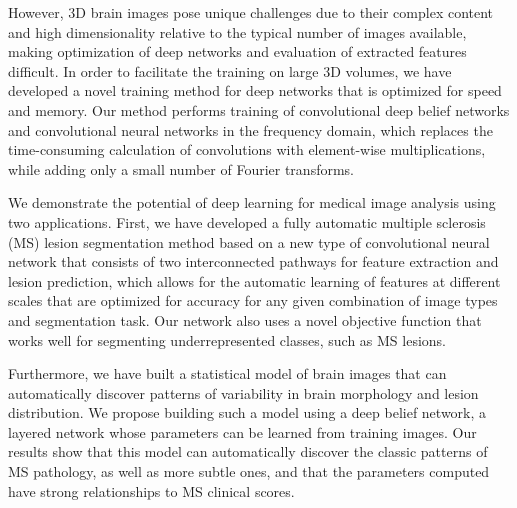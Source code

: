 However, 3D brain images pose unique challenges due to their complex content
and high dimensionality relative to the typical number of images available,
making optimization of deep networks and evaluation of extracted features
difficult. In order to facilitate the training on large 3D volumes, we have
developed a novel training method for deep networks that is optimized
for speed and memory. Our method performs training of convolutional deep belief
networks and convolutional neural networks in the frequency domain, which
replaces the time-consuming calculation of convolutions with element-wise
multiplications, while adding only a small number of Fourier transforms.

We demonstrate the potential of deep learning for medical image analysis using
two applications. First, we have developed a fully automatic multiple sclerosis
(MS) lesion segmentation method based on a new type of convolutional neural
network that consists of two interconnected pathways for feature extraction and
lesion prediction, which allows for the automatic learning of features at
different scales that are optimized for accuracy for any given combination of
image types and segmentation task. Our network also uses a novel objective
function that works well for segmenting underrepresented classes, such as MS
lesions.

Furthermore, we have built a statistical model of brain images that can
automatically discover patterns of variability in brain morphology and lesion
distribution. We propose building such a model using a deep belief network, a
layered network whose parameters can be learned from training images. Our
results show that this model can automatically discover the classic patterns of
MS pathology, as well as more subtle ones, and that the parameters computed have
strong relationships to MS clinical scores.

